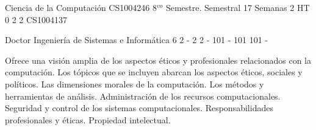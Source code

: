 \documentclass[a4paper,8pt]{article}
\begin{document}
\setNombreProfesor{}
\setGradoProfesorAbreviado{}
\sylabusHeader

\academicaTable
{Ciencia de la Computación} %
{CS1004246} %
{8$^{vo}$ Semestre.} %
{Semestral} %
{17 Semanas} %
{2 HT} %
{} %
{0} %
{}  %
{2} %
{2} %
{CS1004137} %

\administrativaTable
{Doctor} %
{Ingeniería de Sistemas e Informática} %
{6} %
{2} %
{-} %
{2} %
{2} %
{-} %
{101} %
{-} %
{101} %
{101} %
{-} %


\begin{fundamentacion}
Ofrece una visión amplia de los aspectos éticos y profesionales relacionados con la computación. Los tópicos que se incluyen abarcan los aspectos éticos, sociales y políticos. Las dimensiones morales de la computación. Los métodos y herramientas de análisis. Administración de los recursos computacionales. Seguridad y control de los sistemas computacionales. Responsabilidades profesionales y éticas. Propiedad intelectual.

\end{fundamentacion}

\begin{sumilla}
\item \SPHistory
\item \SPSocialContext
\item \SPAnalyticalTools
\item \SPProfessionalEthics
\item \SPIntellectualProperty
\item \SPPrivacyandCivilLiberties
\item \SPSecurityPoliciesLawsandComputerCrimes
\item \SPEconomiesofComputing

\end{sumilla}

\begin{competenciasAsignatura}
\item {}
\item {}
\item {}
\item {}
\item {}
\item {}
\item {}
\item {}

\end{competenciasAsignatura}
\end{document}
